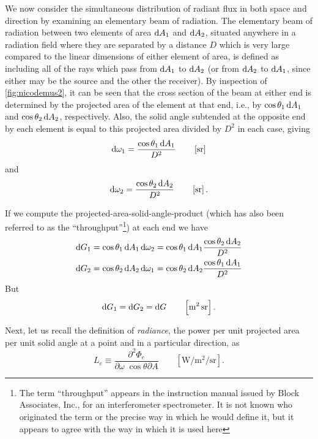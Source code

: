 We now consider the simultaneous distribution of radiant flux in both space
and direction by examining an elementary beam of radiation. The elementary beam
of radiation between two elements of area $\mathop{}\!\mathrm{d} A_1$ and $\mathop{}\!\mathrm{d} A_2$, situated anywhere in
a radiation field where they are separated by a distance $D$ which is very large
compared to the linear dimensions of either element of area, is defined as
including
all of the rays which pass from $\mathop{}\!\mathrm{d} A_1$ to $\mathop{}\!\mathrm{d} A_2$ (or from $\mathop{}\!\mathrm{d} A_2$ to $\mathop{}\!\mathrm{d} A_1$, since either
may be the source and the other the receiver).
By inspection of \cref{fig:nicodemus2}, it can be seen that the cross
section of
the beam at either end is determined by the projected area of the element at
that end,
i.e., by $\cos\theta_1 \mathop{}\!\mathrm{d} A_1$ and $\cos\theta_2 \mathop{}\!\mathrm{d} A_2$, respectively. Also, the
solid angle
subtended at the opposite end by each element is equal to this projected area
divided by
$D^2$ in each case, giving
\begin{equation*}
\d \omega_1 = \frac{\cos\theta_1 \d A_1}{D^2}
\qquad \left[\si{\steradian}\right]
\end{equation*}
and
\begin{equation}
\d \omega_2 = \frac{\cos\theta_2 \d A_2}{D^2}
\qquad \left[\si{\steradian}\right].
\end{equation}

If we compute the projected-area-solid-angle-product (which has also been
referred
to as the ``throughput''\footnote{\label{note:nicodemus7} The term
``throughput'' appears
in the instruction manual issued by Block Associates, Inc., for an
interferometer
spectrometer. It is not known who originated the term or the precise way in
which
he would define it, but it appears to agree with the way in which it is used
here})
at each end we have
\begin{align*}
\d G_1 &= \cos\theta_1 \d A_1 \d \omega_2 = \cos\theta_1 \d A_1 \frac{\cos\theta_2
\d A_2}{D^2} \\
\d G_2 &= \cos\theta_2 \d A_2 \d \omega_1 = \cos\theta_2 \d A_2 \frac{\cos\theta_1
\d A_1}{D^2}
\end{align*}
But
\begin{equation}
\d G_1 = \d G_2 = \d G
\qquad \left[\si{\square\meter\steradian}\right].
\end{equation}

Next, let us recall the definition of \textsl{radiance}, the power per unit
projected
area per unit solid angle at a point and in a particular direction, as
\begin{equation*}
L_e \equiv \frac{\partial^2 \Phi_e}{\partial\omega\;\cos\theta \partial A}
\qquad \left[\si{\watt\per\square\meter\per\steradian}\right].
\end{equation*}

